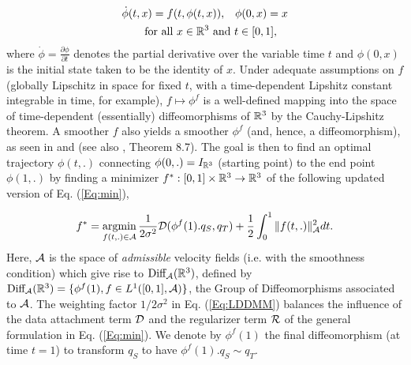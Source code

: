 \begin{equation}
\begin{split}
\dot\phi(t,x) = f(t,\phi(t,x))\textrm{,}\quad \phi(0,x) = x \\ \textrm{ for all } x \in \mathbb{R}^3 \textrm{ and } t \in [0,1]\textrm{,}\quad
\end{split}
\label{Eq:FlowEq}
\end{equation}
where $\dot\phi=\frac{\partial \phi}{\partial t}$ denotes the partial derivative over the variable time $t$ and $\phi(0,x)$ is the initial state taken to be the identity of $x$. Under adequate assumptions on $f$ (globally Lipschitz in space for fixed $t$, with a time-dependent Lipshitz constant integrable in time, for example), $f\mapsto\phi^f$ is a well-defined mapping into the space of time-dependent (essentially) diffeomorphisms of $\mathbb{R}^3$ by the Cauchy-Lipshitz theorem. A smoother $f$ also yields a smoother $\phi^f$ (and, hence, a diffeomorphism), as seen in \cite{trouve1995infinite} and \cite{dupuis1998variational} (see also \cite{younes2010shapes}, Theorem 8.7). The goal is then to find an optimal trajectory $\phi(t,.)$ connecting $\phi(0,.)=I_{\mathbb{R}^3}$ (starting point) to the end point $\phi(1,.)$ by finding a minimizer $f^*:[0,1]\times \mathbb{R}^3 \to \mathbb{R}^3$ of the following updated version of Eq. (\ref{Eq:min}), 

\begin{equation}
f^*=\argmin_{f(t,.)\in \cal{A}}\frac{1}{2\sigma^2}\mathcal{D}(\phi^f(1).q_{S},q_{T})%
+\frac{1}{2} \int_{0}^{1}  \| f(t,.) \|_{\cal{A}}^2 dt.
\label{Eq:LDDMM}
\end{equation}
Here, $\cal{A}$ is the space of \textit{admissible} velocity fields (i.e. with the smoothness condition) which give rise to $\textrm{Diff}_{\cal{A}}(\mathbb{R}^3)$, defined by
$
\textrm{Diff}_{\cal{A}}(\mathbb{R}^3) = \{\phi^f(1), f\in L^1([0,1],\cal{A})\}$, the Group of Diffeomorphisms associated to $\cal{A}$. The weighting factor $1/2\sigma^2$ in Eq. (\ref{Eq:LDDMM}) balances the influence of the data attachment term $\cal D$ and the regularizer term $\cal R$ of the general formulation in Eq. (\ref{Eq:min}). We denote by $\phi^f(1)$ the final diffeomorphism (at time $t=1$) to transform $q_{S}$ to have $\phi^f(1).q_{S} \sim q_{T}$. 

